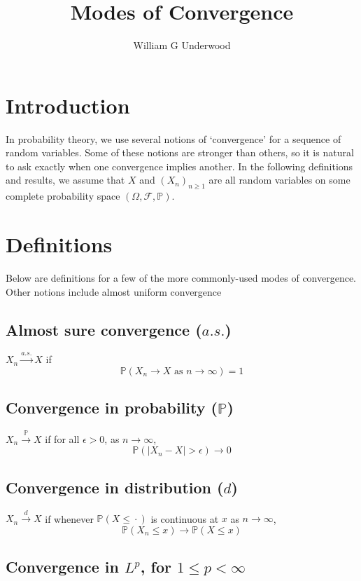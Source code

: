 \documentclass{article}
\title{Modes of Convergence}
\author{William G Underwood}
\begin{document}
\maketitle

\section{Introduction}

In probability theory, we use several notions of `convergence' for
a sequence of random variables.
Some of these notions are stronger than others, so it is natural to ask
exactly when one convergence implies another.
In the following definitions and results, we assume that $X$ and $(X_n)_{n \geq 1}$ are all
random variables on some complete probability space $(\Omega, \mathcal{F}, \mathbb{P})$.


\section{Definitions}

Below are definitions for a few of the more
commonly-used modes of convergence.
Other notions include
almost uniform convergence

\subsection*{Almost sure convergence ($a.s.$)}

$X_n \xrightarrow{a.s.} X$
if
$$\mathbb{P}(X_n \to X \text{ as } n \to \infty) = 1$$

\subsection*{Convergence in probability ($\mathbb{P}$)}

$X_n \xrightarrow{\mathbb{P}} X$
if for all $\epsilon > 0$,
as $n \to \infty$,
$$\mathbb{P}(|X_n - X| > \epsilon) \to 0$$

\subsection*{Convergence in distribution ($d$)}

$X_n \xrightarrow{d} X$
if whenever $\mathbb{P}(X \leq \,\boldsymbol{\cdot}\,)$ is continuous at $x$
as $n \to \infty$,
$$\mathbb{P}(X_n \leq x) \to \mathbb{P}(X \leq x)$$

\subsection*{Convergence in $L^p$, for $1 \leq p < \infty$}
\end{document}
